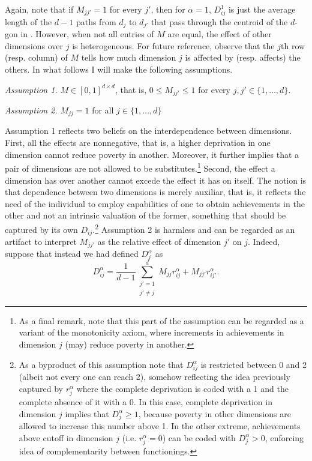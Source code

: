 \documentclass[english, a4paper,12pt]{article}
\begin{document}
Again, note that if $M_{jj'} = 1$ for every $j'$, then for $\alpha = 1$, $D_{ij}^{1}$ is just the average length of the $d-1$ paths from $d_{j}$ to $d_{j'}$ that pass through the centroid of the $d$-gon in . However, when not all entries of $M$ are equal, the effect of other dimensions over $j$ is heterogeneous. For future reference, observe that the $j$th row (resp. column) of $M$ tells how much dimension $j$ is affected by (resp. affects) the others. In what follows I will make the following assumptions. 

	\vspace{1ex}
	\qquad
	\textit{Assumption 1.} $M \in [0,1]^{d \times d}$, that is, $0 \leq M_{jj'} \leq 1$ for every $j,j' \in \{1, \ldots, d\}$.
	
	\qquad
	\textit{Assumption 2.} $M_{jj} = 1$ for all $j \in \{1, \ldots, d\}$
	\vspace{1ex}

Assumption 1 reflects two beliefs on the interdependence between dimensions. First, all the effects are nonnegative, that is, a higher deprivation in one dimension cannot reduce poverty in another. Moreover, it further implies that a pair of dimensions are not allowed to be substitutes.\footnote{As a final remark, note that this part of the assumption can be regarded as a variant of the monotonicity axiom, where increments in achievements in dimension $j$ (may) reduce poverty in another.} Second, the effect a dimension has over another cannot excede the effect it has on itself. The notion is that dependence between two dimensions is merely auxiliar, that is, it reflects the need of the individual to employ capabilities of one to obtain achievements in the other and not an intrinsic valuation of the former, something that should be captured by its own $D_{ij}$.\footnote{As a byproduct of this assumption note that $D_{ij}^{\alpha}$ is restricted between 0 and 2 (albeit not every one can reach 2), somehow reflecting the idea previously captured by $r_{j}^{\alpha}$ where the complete deprivation is coded with a 1 and the complete absence of it with a 0. In this case, complete deprivation in dimension $j$ implies that $D_{j}^{\alpha} \geq 1$, because poverty in other dimensions are allowed to increase this number above 1. In the other extreme, achievements above cutoff in dimension $j$ (i.e. $r_{j}^{\alpha} = 0$) can be coded with $D_{j}^{\alpha} > 0$, enforcing idea of complementarity between functionings.} Assumption 2 is harmless and can be regarded as an artifact to interpret $M_{jj'}$ as the relative effect of dimension $j'$ on $j$. Indeed, suppose that instead we had defined $D_{j}^{\alpha}$ as
	$$D_{ij}^{\alpha} = \frac{1}{d-1} \sum_{\substack{j'=1 \\ j' \neq j}}^{d} M_{jj} r_{ij}^{\alpha} + M_{jj'}r_{ij'}^{\alpha}.$$
\end{document}
